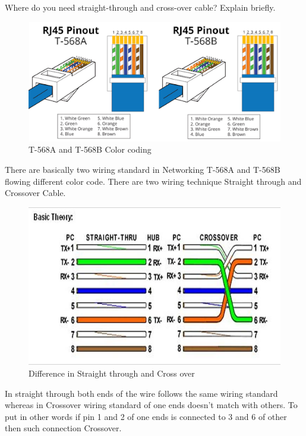 \documentclass[a4paper,12pt]{article}
\begin{document}
\begin{Q}
    {
        Where do you need straight-through and cross-over cable? Explain briefly.
    }
\end{Q}

\begin{A}
    {
        \begin{figure}[H]
            \centering
            \includegraphics[scale=0.9,cframe=blue 0.5pt 3pt]{T568ab.png}
            \caption{T-568A and T-568B Color coding}
        \end{figure}
        There are basically two wiring standard in Networking T-568A and T-568B flowing different color code.
        There are two wiring technique Straight through and Crossover Cable. 

        \begin{figure}[H]
            \centering
            \includegraphics[scale=0.5,cframe=blue 0.5pt 3pt]{straight cross.jpg}
            \caption{Difference in Straight through and Cross over}
        \end{figure}

        In straight through both ends of the wire follows the same wiring standard whereas 
         in Crossover  wiring standard of one ends doesn't match with others. 
         To put in other words if pin 1 and 2 of one ends is connected to 3 and 6 of other then such connection Crossover.
         
}
\end{A}
\end{document}
